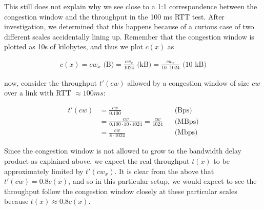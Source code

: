 This still does not explain why we see close to a 1:1 correspondence between the 
congestion window and the throughput in the 100 ms RTT test. After
investigation, we determined that this happens because of a curious case of two
different scales accidentally lining up. Remember that the congestion window is
plotted as 10s of kilobytes, and thus we plot $c(x)$ as

\begin{align*}
  c(x) = cw_x \text{\ (B)}
       = \frac{cw_x}{1024} \text{\ (kB)}
       = \frac{cw_x}{10 \cdot 1024} \text{\ (10 kB)}
\end{align*}

now, consider the throughput $t'(cw)$ allowed by a congestion window of size
$cw$ over a link with RTT $\approx 100ms$:

\begin{align*}
  t'(cw) &= \frac{cw}{0.100}                       &&\text{(Bps)} \\
         &= \frac{cw}{0.100 \cdot 10 \cdot 1024}
          = \frac{cw}{1024}                        &&\text{(MBps)} \\
         &= \frac{cw}{8 \cdot 1024}                &&\text{(Mbps)}
\end{align*}

Since the congestion window is not allowed to grow to the bandwidth delay
product as explained above, we expect the real throughput $t(x)$ to be
approximately limited by $t'(cw_x)$. It is clear from the above that $t'(cw) =
0.8 c(x)$, and so in this particular setup, we would expect to see the
throughput follow the congestion window closely at these particular scales
because $t(x) \approx 0.8 c(x)$.
